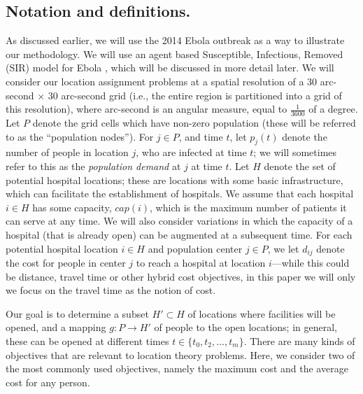 

\subsection*{Notation and definitions.}
As discussed earlier, we will use the 2014 Ebola outbreak as a way to illustrate our methodology.
We will use an agent based Susceptible, Infectious, Removed (SIR) model for Ebola
\cite{rivers:2014ea}, which will be discussed in more detail later.
We will consider our location assignment problems at a spatial resolution of a 
30 arc-second $\times$ 30 arc-second grid (i.e., the entire region is partitioned into a grid of this resolution),
where arc-second is an angular measure, equal to $\frac{1}{3600}$ of a degree.
Let $P$ denote the grid cells which have non-zero
population (these will be referred to as the ``population nodes'').
For $j\in P$, and time $t$, let $p_j(t)$ denote the number of people in location $j$, who are infected at time $t$;
we will sometimes refer to this as the \emph{population demand} at $j$ at time $t$.
Let $H$ denote the set of potential hospital locations; these are
locations with some basic infrastructure, which can facilitate the establishment
of hospitals. We assume that each hospital $i\in H$ has some capacity, $cap(i)$, which is the maximum number of patients it can serve at any time. We will also consider variations in which the capacity of a hospital (that is already open) can be augmented at a subsequent time. For each potential hospital location $i\in H$ and population center $j\in P$, we let $d_{ij}$ denote the cost for people in center $j$ to
reach a hospital at location $i$---while this could be distance, travel time or other
hybrid cost objectives, in this paper we will only
we focus on the travel time as the notion of cost.



Our goal is to determine a subset $H'\subset H$ of locations where facilities will be opened, and a mapping 
$g: P \rightarrow H'$ of people to the open locations; in general, these can be opened at different times
$t \in \{t_0, t_2, \ldots, t_m\}$.
There are many kinds of objectives that are relevant to location theory problems. Here,
we consider two of the most commonly used objectives, namely the maximum cost 
and the average cost for any person. 


